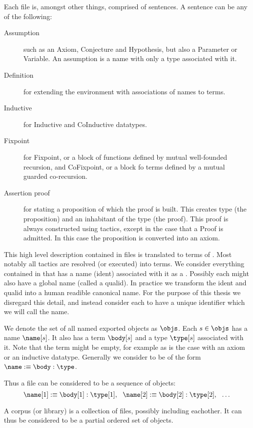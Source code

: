 Each file is, amongst other things, comprised of sentences.
A sentence can be any of the following:
\begin{description}
	\item[Assumption] such as an Axiom, Conjecture and Hypothesis, but also a Parameter or Variable.
		An assumption is a name with only a type associated with it.
	\item[Definition] for extending the environment with associations of names to terms.
		
	\item[Inductive] for Inductive and CoInductive datatypes.
	\item[Fixpoint] for Fixpoint, or a block of functions defined by mutual well-founded recursion, and CoFixpoint, or a block fo terms defined by a mutual guarded co-recursion.
	\item[Assertion proof] for stating a proposition of which the proof is built.
		This creates type (the proposition) and an inhabitant of the type (the proof).
		This proof is always constructed using tactics, except in the case that a Proof is admitted.
		In this case the proposition is converted into an axiom.
\end{description}


This high level description contained in \coq files is translated to terms of \pcic.
Most notably all tactics are resolved (or executed) into terms.
We consider everything contained in \pcic that has a name (ident) associated with it as a \coqobj.
Possibly each \coqobj might also have a global name (called a qualid).
In practice we transform the ident and qualid into a human readible canonical name.
For the purpose of this thesis we disregard this detail, and instead consider each \coqobj to have a unique identifier which we will call the name.

\begin{definition}[{\coqobj[s]}]
	We denote the set of all named exported \coq objects as $\objs$.
	Each \coqobj $s \in \objs$ has a name $\name[s]$.
	It also has a term $\body[s]$ and a type $\type[s]$ associated with it.
	Note that the term might be empty, for example as is the case with an axiom or an inductive datatype.
	Generally we consider \coqobj[s] to be of the form $\name :\equiv \body : \type$.
\end{definition}

Thus a \coq file can be considered to be a sequence of \coq objects:
$$ \name[1] :\equiv \body[1] : \type[1], ~~ \name[2] :\equiv \body[2] : \type[2], ~~ \ldots $$

A \coq corpus (or library) is a collection of \coq files, possibly including eachother.
It can thus be considered to be a partial ordered set of \coq objects.

